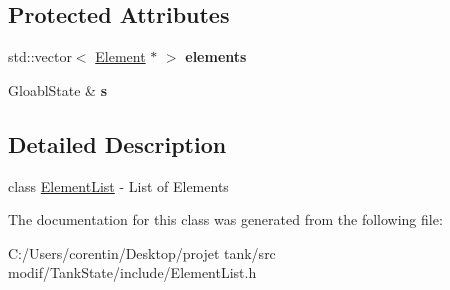 \subsection*{Protected Attributes}
\begin{DoxyCompactItemize}
\item 
\mbox{\label{classstate_1_1_element_list_ad45de440cd860cf5449d779a8db383de}} 
std\+::vector$<$ \hyperlink{classstate_1_1_element}{Element} $\ast$ $>$ {\bfseries elements}
\item 
\mbox{\label{classstate_1_1_element_list_a9c9c837b67a81e2187d19a6a045bc92f}} 
Gloabl\+State \& {\bfseries s}
\end{DoxyCompactItemize}


\subsection{Detailed Description}
class \hyperlink{classstate_1_1_element_list}{Element\+List} -\/ List of Elements 

The documentation for this class was generated from the following file\+:\begin{DoxyCompactItemize}
\item 
C\+:/\+Users/corentin/\+Desktop/projet tank/src modif/\+Tank\+State/include/Element\+List.\+h\end{DoxyCompactItemize}
